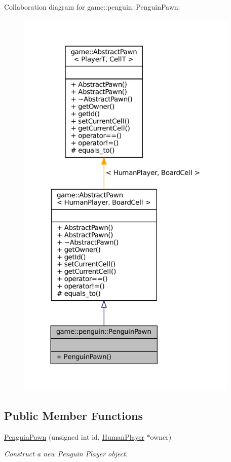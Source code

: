 Collaboration diagram for game\+:\+:penguin\+:\+:Penguin\+Pawn\+:
\nopagebreak
\begin{figure}[H]
\begin{center}
\leavevmode
\includegraphics[height=550pt]{classgame_1_1penguin_1_1_penguin_pawn__coll__graph}
\end{center}
\end{figure}
\subsection*{Public Member Functions}
\begin{DoxyCompactItemize}
\item 
\hyperlink{classgame_1_1penguin_1_1_penguin_pawn_a8115a301c726af8951a29560b456abca}{Penguin\+Pawn} (unsigned int id, \hyperlink{classgame_1_1penguin_1_1_human_player}{Human\+Player} $\ast$owner)
\begin{DoxyCompactList}\small\item\em Construct a new Penguin Player object. \end{DoxyCompactList}\end{DoxyCompactItemize}
